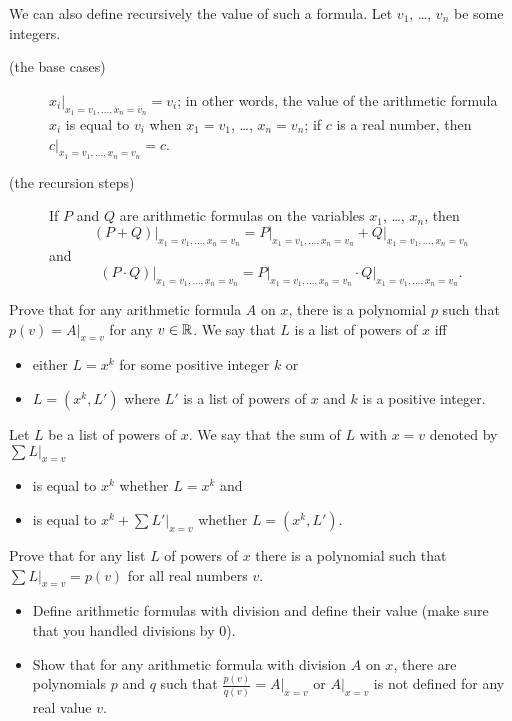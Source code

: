 \begin{chapterendexercises}
    We can also define recursively the value of such a formula.
    Let $v_1$, \dots, $v_n$ be some integers.
    \begin{description}
      \item[(the base cases)] $x_i\big\rvert_{x_1 = v_1, \dots, x_n = v_n} = v_i$; in
        other words, the value of the arithmetic formula $x_i$ is equal to $v_i$
        when $x_1 = v_1$, \dots, $x_n = v_n$; if $c$ is a real number, then
        $c\rvert_{x_1 = v_1, \dots, x_n = v_n} = c$.
      \item[(the recursion steps)] If $P$ and $Q$ are arithmetic formulas on the
        variables $x_1$, \dots, $x_n$, then
        \[
          (P + Q)\big\rvert_{x_1 = v_1, \dots, x_n = v_n} =
          P\big\rvert_{x_1 = v_1, \dots, x_n = v_n} +
          Q\big\rvert_{x_1 = v_1, \dots, x_n = v_n}
        \]
        and
        \[
          (P \cdot Q)\big\rvert_{x_1 = v_1, \dots, x_n = v_n} =
          P\big\rvert_{x_1 = v_1, \dots, x_n = v_n} \cdot
          Q\big\rvert_{x_1 = v_1, \dots, x_n = v_n}.
        \]
    \end{description}

    Prove that for any arithmetic formula $A$ on $x$, there is a polynomial
    $p$ such that $p(v) = A\big\rvert_{x = v}$ for any $v \in \mathbb{R}$.
  \exercise We say that $L$ is a list of powers of $x$ iff
    \begin{itemize}
      \item either $L = x^k$ for some positive integer $k$ or
      \item $L = (x^k, L')$ where $L'$ is a list of powers of $x$ and
        $k$ is a positive integer.
    \end{itemize}

    Let $L$ be a list of powers of $x$. We say that the sum of $L$
    with $x = v$ denoted by $\sum L\big\rvert_{x = v}$
    \begin{itemize}
      \item is equal to $x^k$ whether $L = x^k$ and
      \item is equal to $x^k + \sum L'\big\rvert_{x = v}$ whether
        $L = (x^k, L')$.
    \end{itemize}

    Prove that for any list $L$ of powers of $x$ there is a polynomial such that
    $\sum L\big\rvert_{x = v} = p(v)$ for all real numbers $v$.
  \exercise
    \begin{itemize}
      \item Define arithmetic formulas with division and define their value (make
        sure that you handled divisions by $0$).

      \item Show that for any arithmetic formula with division $A$ on $x$,
        there are polynomials $p$ and $q$ such that $\frac{p(v)}{q(v)} =
        A\big\rvert_{x = v}$ or $A\big\rvert_{x = v}$ is not defined for
        any real value $v$.
    \end{itemize}
\end{chapterendexercises}
